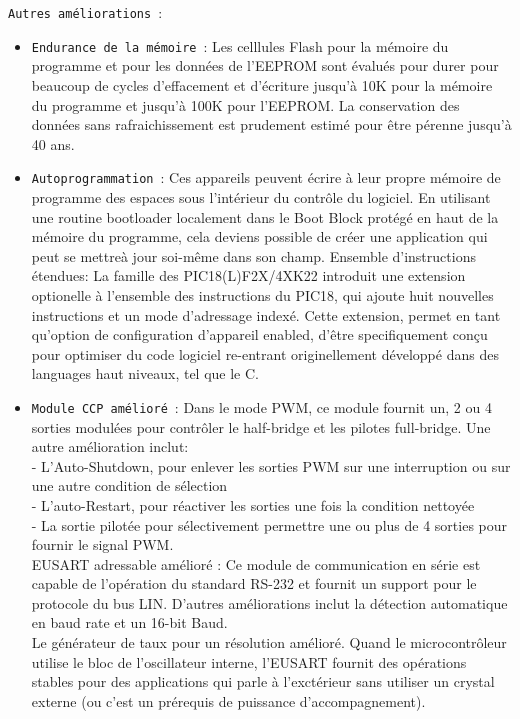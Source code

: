 \documentclass[a4paper, 12pt]{book}
\newcounter{program}[subsection]
\begin{document}
\texttt{Autres améliorations}~:
\begin{itemize}
\item \texttt{Endurance de la mémoire}~:
Les celllules Flash pour la mémoire du programme et pour les données de l’EEPROM sont évalués pour durer pour beaucoup de cycles d’effacement et d’écriture jusqu’à 10K pour la mémoire du programme et jusqu’à 100K pour l’EEPROM. La conservation des données sans rafraichissement est prudement estimé pour être pérenne jusqu’à 40 ans.
\item \texttt{Autoprogrammation}~:
Ces appareils peuvent écrire à leur propre mémoire de programme des espaces sous l’intérieur du contrôle du logiciel. En utilisant une routine bootloader localement dans le Boot Block protégé en haut de la mémoire du programme, cela deviens possible de créer une application qui peut se mettreà jour soi-même dans son champ.
Ensemble d’instructions étendues:
La famille des PIC18(L)F2X/4XK22 introduit une extension optionelle à l’ensemble des instructions du PIC18, qui ajoute huit nouvelles instructions et un mode d’adressage indexé.
Cette extension, permet en tant qu’option de configuration d’appareil enabled, d’être specifiquement conçu pour optimiser du code logiciel re-entrant originellement développé dans des languages haut niveaux, tel que le C.
\item \texttt{Module CCP amélioré}~:
Dans le mode PWM, ce module fournit un, 2 ou 4 sorties modulées pour contrôler le half-bridge et les pilotes full-bridge. Une autre amélioration inclut:\\
- L’Auto-Shutdown, pour enlever les sorties PWM sur une interruption ou sur une autre condition de sélection\\
- L’auto-Restart, pour réactiver les sorties une fois la condition nettoyée\\
- La sortie pilotée pour sélectivement permettre une ou plus de 4 sorties pour fournir le signal PWM.\\
EUSART adressable amélioré :
Ce module de communication en série est capable de l’opération du standard RS-232 et fournit un support pour le protocole du bus LIN. D’autres améliorations inclut la détection automatique en baud rate et un 16-bit Baud.\\
Le générateur de taux pour un résolution amélioré. Quand le microcontrôleur utilise le bloc de l’oscillateur interne, l’EUSART fournit des opérations stables pour des applications qui parle à l’exctérieur sans utiliser un crystal externe (ou c’est un prérequis de puissance d'accompagnement).

\end{itemize}
\end{document}
